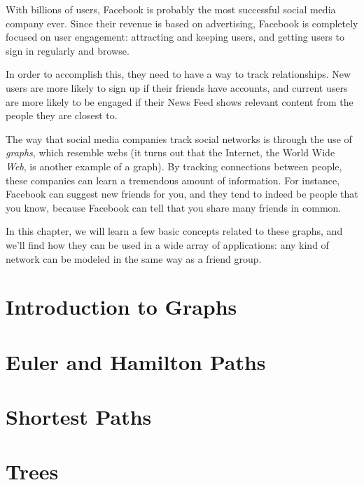 \documentclass[9pt,letter,twoside,openright]{memoir}
\begin{document}
With billions of users, Facebook is probably the most successful social media company ever.  Since their revenue is based on advertising, Facebook is completely focused on user engagement: attracting and keeping users, and getting users to sign in regularly and browse.

In order to accomplish this, they need to have a way to track relationships.  New users are more likely to sign up if their friends have accounts, and current users are more likely to be engaged if their News Feed shows relevant content from the people they are closest to.

The way that social media companies track social networks is through the use of \emph{graphs}, which resemble webs (it turns out that the Internet, the World Wide \emph{Web}, is another example of a graph).  By tracking connections between people, these companies can learn a tremendous amount of information.  For instance, Facebook can suggest new friends for you, and they tend to indeed be people that you know, because Facebook can tell that you share many friends in common.

In this chapter, we will learn a few basic concepts related to these graphs, and we'll find how they can be used in a wide array of applications: any kind of network can be modeled in the same way as a friend group.
\vfill
\pagebreak

\section{Introduction to Graphs}



\section{Euler and Hamilton Paths}



\section{Shortest Paths}



\section{Trees}


\end{document}
